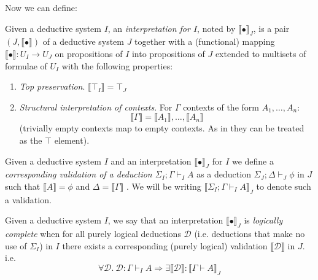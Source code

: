 Now we can define: 
\begin{definition}Given a deductive system $I$, an   \textit{interpretation for $I$}, noted by $\llbracket\bullet \rrbracket_J$, is a pair
	$(J,\llbracket\bullet\rrbracket)$ of a deductive  system $J$ together
	with a (functional) mapping $\llbracket \bullet \rrbracket: U_I\rightarrow U_J$ on propositions of $I$ into propositions of $J$ extended to multisets of 
	formulae of $U_I$ with the following properties:
	\begin{enumerate}
		\item \textit{Top preservation}. $\llbracket\top_I \rrbracket = \top_J$
		\item \textit{Structural interpretation of contexts}. For  $\Gamma$ contexts of the form $A_1,\ldots, A_n$:
		$$\llbracket\Gamma \rrbracket=\llbracket A_1  \rrbracket,\ldots,  \llbracket A_n\rrbracket$$ (trivially empty contexts map to empty contexts. 
		As in \cite{lambek1968deductive} they can be treated as 
		the $\top$ element).
	\end{enumerate}
\end{definition}
\begin{definition}Given a deductive system $I$  and an  interpretation $\llbracket\bullet\rrbracket_J$ for $I$ we define
	a \textit{corresponding validation of a deduction $\Sigma_I;\Gamma\vdash_I A$}  
	as a deduction $\Sigma_J;\Delta\vdash_{J} \phi$ in $J$ such that $\llbracket A \rrbracket=\phi$ and $\Delta=\llbracket \Gamma \rrbracket $ . We will be writing
	$ \llbracket \Sigma_I;\Gamma\vdash_I A\rrbracket_J$ to denote such a validation.
\end{definition}
\begin{definition}
	Given a deductive system $I$, we say that an interpretation  $\llbracket\bullet \rrbracket_J$  is \textit{logically complete} when  for
	all purely logical deductions $\mathcal{D}$ (i.e. deductions that make no use of $\Sigma_I$) in $I$ 
	there exists a corresponding (purely logical) validation $\llbracket\mathcal{D}\rrbracket$ in $J$.
	i.e. $$\forall \mathcal{D}. \ \mathcal{D}:\Gamma\vdash_I A \Longrightarrow \exists \llbracket\mathcal{D}\rrbracket: \llbracket \Gamma\vdash A\rrbracket_J$$
\end{definition}
